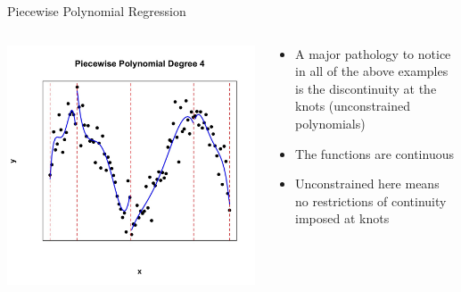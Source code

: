 \documentclass[english]{beamer}
\newcommand{\alertblue}[1]{{\color{blue}#1}}
\begin{document}
\begin{frame}{Piecewise Polynomial Regression}
    \begin{columns}
        \begin{column}{0.5\textwidth}
            \centering
            \includegraphics[width=\linewidth]{images/piecewise_degree_4.jpeg} 
        \end{column}
        \begin{column}{0.6\textwidth}
            \begin{itemize}
                \item A major pathology to notice in all of the above examples is the \alertblue{discontinuity} at the knots (\alertblue{unconstrained polynomials}) 
                \item The functions are continuous 
                \item Unconstrained here means \alertblue{no restrictions of continuity imposed} at knots
            \end{itemize}
        \end{column}
    \end{columns}
\end{frame}
\end{document}
